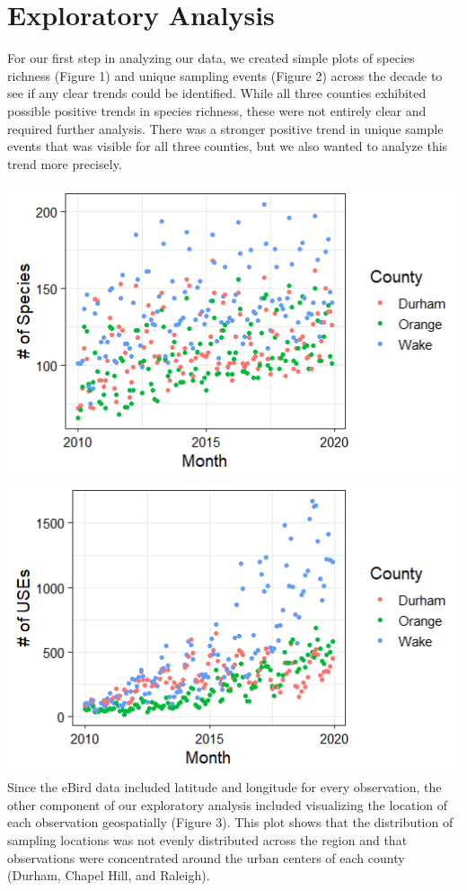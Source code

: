 \documentclass[
  12pt,
]{article}
\begin{document}
\newpage

\hypertarget{exploratory-analysis}{%
\section{Exploratory Analysis}\label{exploratory-analysis}}

For our first step in analyzing our data, we created simple plots of
species richness (Figure 1) and unique sampling events (Figure 2) across
the decade to see if any clear trends could be identified. While all
three counties exhibited possible positive trends in species richness,
these were not entirely clear and required further analysis. There was a
stronger positive trend in unique sample events that was visible for all
three counties, but we also wanted to analyze this trend more precisely.

\includegraphics{./Output/EDA_SppRichness_Plot.png}
\includegraphics{./Output/EDA_EventCount_Plot.png} Since the eBird data
included latitude and longitude for every observation, the other
component of our exploratory analysis included visualizing the location
of each observation geospatially (Figure 3). This plot shows that the
distribution of sampling locations was not evenly distributed across the
region and that observations were concentrated around the urban centers
of each county (Durham, Chapel Hill, and Raleigh).
\end{document}
